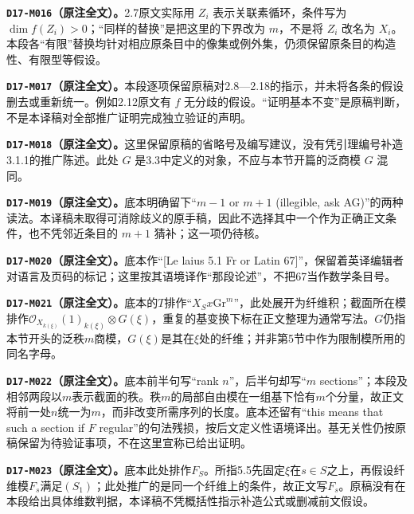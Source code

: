 \documentclass[UTF8,a4paper]{ctexbook}
\begin{document}
\par\medskip\noindent\textbf{\texttt{D17-M016}（原注全文）。}2.7原文实际用 $Z_i$ 表示关联素循环，条件写为 $\dim f(Z_i)>0$；“同样的替换”是把这里的下界改为 $m$，不是将 $Z_i$ 改名为 $X_i$。本段各“有限”替换均针对相应原条目中的像集或例外集，仍须保留原条目的构造性、有限型等假设。

\par\medskip\noindent\textbf{\texttt{D17-M017}（原注全文）。}本段逐项保留原稿对2.8—2.18的指示，并未将各条的假设删去或重新统一。例如2.12原文有 $f$ 无分歧的假设。“证明基本不变”是原稿判断，不是本译稿对全部推广证明完成独立验证的声明。

\par\medskip\noindent\textbf{\texttt{D17-M018}（原注全文）。}这里保留原稿的省略号及编写建议，没有凭引理编号补造3.1.1的推广陈述。此处 $G$ 是3.3中定义的对象，不应与本节开篇的泛商模 $G$ 混同。

\par\medskip\noindent\textbf{\texttt{D17-M019}（原注全文）。}底本明确留下“$m-1$ or $m+1$ (illegible, ask AG)”的两种读法。本译稿未取得可消除歧义的原手稿，因此不选择其中一个作为正确正文条件，也不凭邻近条目的 $m+1$ 猜补；这一项仍待核。

\par\medskip\noindent\textbf{\texttt{D17-M020}（原注全文）。}底本作“[Le laius 5.1 Fr or Latin 67]”，保留着英译编辑者对语言及页码的标记；这里按其语境译作“那段论述”，不把67当作数学条目号。

\par\medskip\noindent\textbf{\texttt{D17-M021}（原注全文）。}底本的$T$排作“$X_Sx\mathrm{Gr}^m$”，此处展开为纤维积；截面所在模排作$\mathcal O_{X_{k(\xi)}}(1)_{k(\xi)}\otimes G(\xi)$，重复的基变换下标在正文整理为通常写法。$G$仍指本节开头的泛秩$m$商模，$G(\xi)$是其在$\xi$处的纤维；并非第5节中作为限制模所用的同名字母。

\par\medskip\noindent\textbf{\texttt{D17-M022}（原注全文）。}底本前半句写“rank $n$”，后半句却写“$m$ sections”；本段及相邻两段以$m$表示截面的秩。秩$m$的局部自由模在一组基下恰有$m$个分量，故正文将前一处$n$统一为$m$，而非改变所需序列的长度。底本还留有“this means that such a section if $F$ regular”的句法残损，按后文定义性语境译出。基无关性仍按原稿保留为待验证事项，不在这里宣称已给出证明。

\par\medskip\noindent\textbf{\texttt{D17-M023}（原注全文）。}底本此处排作$F_S$。所指5.5先固定$\xi$在$s\in S$之上，再假设纤维模$F_s$满足$(S_1)$；此处推广的是同一个纤维上的条件，故正文写$F_s$。原稿没有在本段给出具体维数判据，本译稿不凭概括性指示补造公式或删减前文假设。
\end{document}
